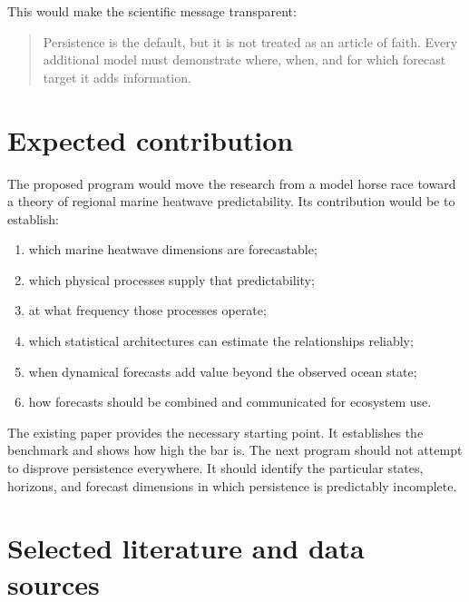 \documentclass[11pt]{article}
\newcommand{\MHW}{marine heatwave}
\begin{document}
This would make the scientific message transparent:

\begin{quote}
Persistence is the default, but it is not treated as an article of faith. Every additional model must demonstrate where, when, and for which forecast target it adds information.
\end{quote}

\section{Expected contribution}

The proposed program would move the research from a model horse race toward a theory of regional \MHW{} predictability. Its contribution would be to establish:

\begin{enumerate}
  \item which \MHW{} dimensions are forecastable;
  \item which physical processes supply that predictability;
  \item at what frequency those processes operate;
  \item which statistical architectures can estimate the relationships reliably;
  \item when dynamical forecasts add value beyond the observed ocean state;
  \item how forecasts should be combined and communicated for ecosystem use.
\end{enumerate}

The existing paper provides the necessary starting point. It establishes the benchmark and shows how high the bar is. The next program should not attempt to disprove persistence everywhere. It should identify the particular states, horizons, and forecast dimensions in which persistence is predictably incomplete.

\section*{Selected literature and data sources}
\end{document}
